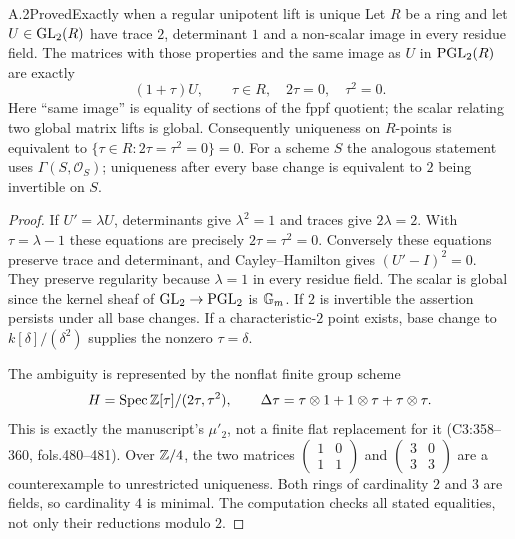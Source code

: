 \begin{statement}{A.2}{Proved}{Exactly when a regular unipotent lift is unique}
Let $R$ be a ring and let $U\in\operatorname{GL}_2(R)$ have trace $2$, determinant $1$
and a non-scalar image in every residue field. The matrices with those
properties and the same image as $U$ in $\operatorname{PGL}_2(R)$ are exactly
\[
 (1+\tau)U,\qquad \tau\in R,\quad 2\tau=0,\quad\tau^2=0.
\]
Here ``same image'' is equality of sections of the fppf quotient;
the scalar relating two global matrix lifts is global. Consequently
uniqueness on $R$-points is equivalent to
$\{\tau\in R:2\tau=\tau^2=0\}=0$. For a scheme $S$ the analogous
statement uses $\Gamma(S,\mathcal O_S)$; uniqueness after every base
change is equivalent to $2$ being invertible on $S$.
\end{statement}
\begin{proof}
If $U'=\lambda U$, determinants give $\lambda^2=1$ and traces give
$2\lambda=2$. With $\tau=\lambda-1$ these equations are precisely
$2\tau=\tau^2=0$. Conversely these equations preserve trace and
determinant, and Cayley--Hamilton gives $(U'-I)^2=0$. They preserve
regularity because $\lambda=1$ in every residue field. The scalar is
global since the kernel sheaf of $\operatorname{GL}_2\to\operatorname{PGL}_2$ is $\mathbb G_m$.
If $2$ is invertible the assertion persists under all base changes.
If a characteristic-$2$ point exists, base change to
$k[\delta]/(\delta^2)$ supplies the nonzero $\tau=\delta$.

The ambiguity is represented by the nonflat finite group scheme
\[
 H=\operatorname{Spec}\mathbb Z[\tau]/(2\tau,\tau^2),\qquad
 \Delta\tau=\tau\otimes1+1\otimes\tau+\tau\otimes\tau.
\]
This is exactly the manuscript's $\mu'_2$, not a finite flat replacement
for it (C3:358--360, fols.480--481). Over $\mathbb Z/4$, the two matrices
$\left(\begin{smallmatrix}1&0\\1&1\end{smallmatrix}\right)$ and
$\left(\begin{smallmatrix}3&0\\3&3\end{smallmatrix}\right)$ are a
counterexample to unrestricted uniqueness. Both rings of cardinality
$2$ and $3$ are fields, so cardinality $4$ is minimal. The computation
checks all stated equalities, not only their reductions modulo $2$.
\end{proof}

